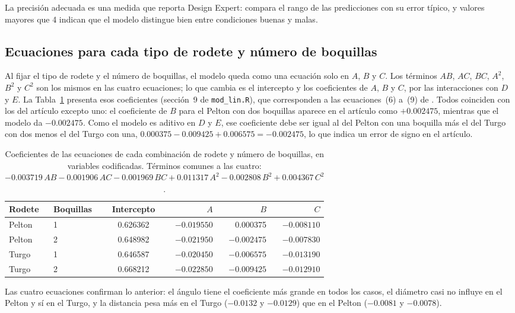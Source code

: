 La precisión adecuada es una medida que reporta Design Expert: compara el rango de las predicciones con su error típico, y valores mayores que 4 indican que el modelo distingue bien entre condiciones buenas y malas.

\subsection{Ecuaciones para cada tipo de rodete y número de boquillas}

Al fijar el tipo de rodete y el número de boquillas, el modelo queda como una ecuación solo en $A$, $B$ y $C$. Los términos $AB$, $AC$, $BC$, $A^2$, $B^2$ y $C^2$ son los mismos en las cuatro ecuaciones; lo que cambia es el intercepto y los coeficientes de $A$, $B$ y $C$, por las interacciones con $D$ y $E$. La Tabla~\ref{tab:ecuaciones} presenta esos coeficientes (sección~9 de \texttt{mod\_lin.R}), que corresponden a las ecuaciones~(6) a~(9) de \citet{Lakdawala2025}. Todos coinciden con los del artículo excepto uno: el coeficiente de $B$ para el Pelton con dos boquillas aparece en el artículo como $+0.002475$, mientras que el modelo da $-0.002475$. Como el modelo es aditivo en $D$ y $E$, ese coeficiente debe ser igual al del Pelton con una boquilla más el del Turgo con dos menos el del Turgo con una, $0.000375 - 0.009425 + 0.006575 = -0.002475$, lo que indica un error de signo en el artículo.

\begin{table}[ht]
\centering
\caption{Coeficientes de las ecuaciones de cada combinación de rodete y número de boquillas, en variables codificadas. Términos comunes a las cuatro: $-0.003719\,AB - 0.001906\,AC - 0.001969\,BC + 0.011317\,A^2 - 0.002808\,B^2 + 0.004367\,C^2$.}
\label{tab:ecuaciones}
\begin{tabular}{llcrrr}
\toprule
Rodete & Boquillas & Intercepto & $A$ & $B$ & $C$ \\
\midrule
Pelton & 1 & 0.626362 & $-0.019550$ &  0.000375 & $-0.008110$ \\
Pelton & 2 & 0.648982 & $-0.021950$ & $-0.002475$ & $-0.007830$ \\
Turgo  & 1 & 0.646587 & $-0.020450$ & $-0.006575$ & $-0.013190$ \\
Turgo  & 2 & 0.668212 & $-0.022850$ & $-0.009425$ & $-0.012910$ \\
\bottomrule
\end{tabular}
\end{table}

Las cuatro ecuaciones confirman lo anterior: el ángulo tiene el coeficiente más grande en todos los casos, el diámetro casi no influye en el Pelton y sí en el Turgo, y la distancia pesa más en el Turgo ($-0.0132$ y $-0.0129$) que en el Pelton ($-0.0081$ y $-0.0078$).

